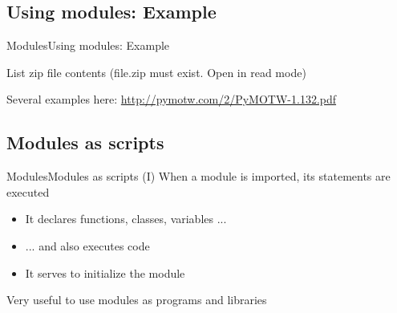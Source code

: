 \documentclass[10pt,compress]{beamer} %
\begin{document}
\subsection{Using modules: Example}

\begin{frame}[fragile]{Modules}{Using modules: Example}
	\vspace{-0.2cm}
	\begin{exampleblock}{List zip file contents (file.zip must exist. Open in read mode)}
	\vspace{-0.2cm}
	
	\vspace{-0.2cm}
	\end{exampleblock}
	
	\vspace{-0.2cm}
	\centering \footnotesize{Several examples here: \url{http://pymotw.com/2/PyMOTW-1.132.pdf}}
\end{frame}

\subsection{Modules as scripts}

\begin{frame}{Modules}{Modules as scripts (I)}
	When a module is imported, its statements are executed
		\begin{itemize}
		\item It declares functions, classes, variables ...
		\item ... and also executes code
		\item It serves to initialize the module
		\end{itemize}
	Very useful to use modules as programs and libraries
\end{frame}
\end{document}
